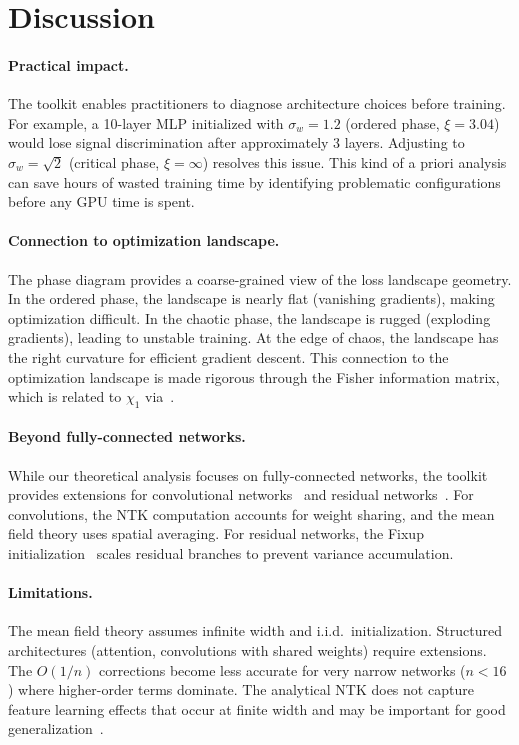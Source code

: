 \documentclass[10pt]{article}
\theoremstyle{definition}
\begin{document}
\section{Discussion}
\label{sec:discussion}

\paragraph{Practical impact.}
The toolkit enables practitioners to diagnose architecture choices before training.
For example, a 10-layer MLP initialized with $\sigma_w = 1.2$ (ordered phase, $\xi = 3.04$) would lose signal discrimination after approximately 3 layers.
Adjusting to $\sigma_w = \sqrt{2}$ (critical phase, $\xi = \infty$) resolves this issue.
This kind of a priori analysis can save hours of wasted training time by identifying problematic configurations before any GPU time is spent.

\paragraph{Connection to optimization landscape.}
The phase diagram provides a coarse-grained view of the loss landscape geometry.
In the ordered phase, the landscape is nearly flat (vanishing gradients), making optimization difficult.
In the chaotic phase, the landscape is rugged (exploding gradients), leading to unstable training.
At the edge of chaos, the landscape has the right curvature for efficient gradient descent.
This connection to the optimization landscape is made rigorous through the Fisher information matrix, which is related to $\chi_1$ via~\citep{karakida2019universal}.

\paragraph{Beyond fully-connected networks.}
While our theoretical analysis focuses on fully-connected networks, the toolkit provides extensions for convolutional networks~\citep{xiao2018dynamical} and residual networks~\citep{zhang2019fixup}.
For convolutions, the NTK computation accounts for weight sharing, and the mean field theory uses spatial averaging.
For residual networks, the Fixup initialization~\citep{zhang2019fixup} scales residual branches to prevent variance accumulation.

\paragraph{Limitations.}
The mean field theory assumes infinite width and i.i.d.\ initialization.
Structured architectures (attention, convolutions with shared weights) require extensions.
The $O(1/n)$ corrections become less accurate for very narrow networks ($n < 16$) where higher-order terms dominate.
The analytical NTK does not capture feature learning effects that occur at finite width and may be important for good generalization~\citep{yang2021tensor}.
\end{document}
